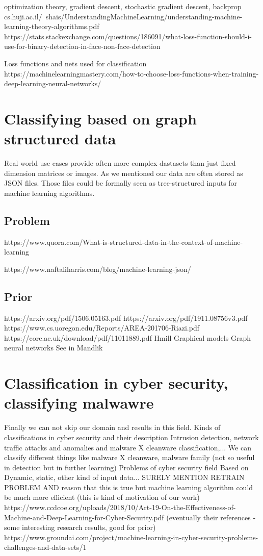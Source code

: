 optimization theory, gradient descent, stochastic gradient descent, backprop
cs.huji.ac.il/~shais/UnderstandingMachineLearning/understanding-machine-learning-theory-algorithms.pdf
https://stats.stackexchange.com/questions/186091/what-loss-function-should-i-use-for-binary-detection-in-face-non-face-detection

Loss functions and nets used for classification
https://machinelearningmastery.com/how-to-choose-loss-functions-when-training-deep-learning-neural-networks/

\section{Classifying based on graph structured data}
Real world use cases provide often more complex dastasets than just fixed dimension matrices or images. As we mentioned our data are often stored as JSON files. Those files could be formally seen as tree-structured inputs for machine learning algorithms. 
\subsection{Problem}
https://www.quora.com/What-is-structured-data-in-the-context-of-machine-learning

https://www.naftaliharris.com/blog/machine-learning-json/

\subsection{Prior}
https://arxiv.org/pdf/1506.05163.pdf
https://arxiv.org/pdf/1911.08756v3.pdf
https://www.cs.uoregon.edu/Reports/AREA-201706-Riazi.pdf
https://core.ac.uk/download/pdf/11011889.pdf
Hmill
Graphical models
Graph neural networks
See in Mandlik

\section{Classification in cyber security, classifying malwawre}
Finally we can not skip our domain and results in this field. 
Kinds of classifications in cyber security and their description
Intrusion detection, network traffic attacks and anomalies and malware X cleanware classification,...
We can classify different things like malware X cleanware, malware family (not so useful in detection but in further learning)
Problems of cyber security field
Based on Dynamic, static, other kind of input data...
SURELY MENTION RETRAIN PROBLEM AND reason that this is true but machine learning algorithm could be much more efficient (this is kind of motivation of our work)
https://www.ccdcoe.org/uploads/2018/10/Art-19-On-the-Effectiveness-of-Machine-and-Deep-Learning-for-Cyber-Security.pdf (eventually their references - some interesting research results, good for prior)
https://www.groundai.com/project/machine-learning-in-cyber-security-problems-challenges-and-data-sets/1

